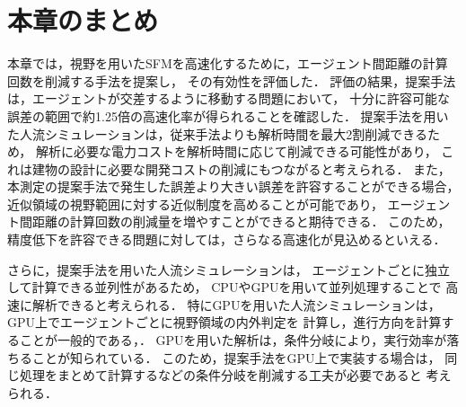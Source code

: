 \section{本章のまとめ}%
本章では，視野を用いたSFMを高速化するために，エージェント間距離の計算回数を削減する手法を提案し，
その有効性を評価した．
評価の結果，提案手法は，エージェントが交差するように移動する問題において，
十分に許容可能な誤差の範囲で約1.25倍の高速化率が得られることを確認した．
提案手法を用いた人流シミュレーションは，従来手法よりも解析時間を最大2割削減できるため，
解析に必要な電力コストを解析時間に応じて削減できる可能性があり，
これは建物の設計に必要な開発コストの削減にもつながると考えられる．
また，本測定の提案手法で発生した誤差より大きい誤差を許容することができる場合，
近似領域の視野範囲に対する近似制度を高めることが可能であり，
エージェント間距離の計算回数の削減量を増やすことができると期待できる．
このため，精度低下を許容できる問題に対しては，さらなる高速化が見込めるといえる．

さらに，提案手法を用いた人流シミュレーションは，
エージェントごとに独立して計算できる並列性があるため，
CPUやGPUを用いて並列処理することで
高速に解析できると考えられる．
特にGPUを用いた人流シミュレーションは，GPU上でエージェントごとに視野領域の内外判定を
計算し，進行方向を計算することが一般的である\cite{seru_sfm1}，\cite{seru_sfm2}．
GPUを用いた解析は，条件分岐により，実行効率が落ちることが知られている．
このため，提案手法をGPU上で実装する場合は，
同じ処理をまとめて計算するなどの条件分岐を削減する工夫が必要であると
考えられる．
\fi


